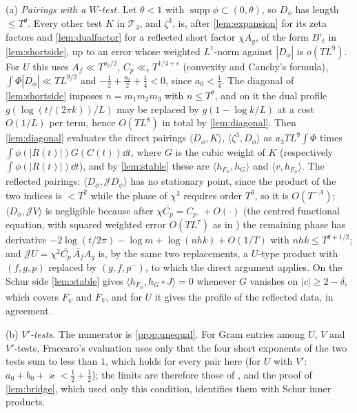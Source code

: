 \documentclass[11pt,colorlinks]{charlie}
\newcommand{\ip}[2]{\langle #1,#2\rangle}
\begin{document}
(a) \emph{Pairings with a $W$-test.} Let $\theta<1$ with $\operatorname{supp}\phi\subset(0,\theta)$, so $D_\phi$ has length $\le T^\theta$. Every other test $K$ in $\mathcal T_3$, and $\zeta^3$, is, after \cref{lem:expansion} for its zeta factors and \cref{lem:dualfactor} for a reflected short factor $\chi\overline{A_g}$, of the form $B'_t$ in \cref{lem:shortside}, up to an error whose weighted $L^1$-norm against $|D_\phi|$ is $o(TL^9)$. For $U$ this uses $A_f\ll T^{a_0/2}$, $C_p\ll_\epsilon T^{1/4+\epsilon}$ (convexity and Cauchy's formula), $\int\Phi|D_\phi|\ll TL^{9/2}$ and $-\frac12+\frac{a_0}2+\frac14<0$, since $a_0<\frac14$. The diagonal of \cref{lem:shortside} imposes $n=m_1m_2m_3$ with $n\le T^\theta$, and on it the dual profile $g(\log(t/(2\pi k))/L)$ may be replaced by $g(1-\log k/L)$ at a cost $O(1/L)$ per term, hence $O(TL^8)$ in total by \cref{lem:diagonal}. Then \cref{lem:diagonal} evaluates the direct pairings $\ip{D_\phi}{K}$, $\ip{\zeta^3}{D_\phi}$ as $a_3TL^9\int\Phi$ times $\int\phi(|R(t)|)G(C(t))\dd t$, where $G$ is the cubic weight of $K$ (respectively $\int\phi(|R(t)|)\dd t$), and by \cref{lem:stable} these are $\ip{h_{F_\phi}}{h_G}$ and $\ip{v}{h_{F_\phi}}$. The reflected pairings: $\ip{D_\phi}{\mathcal JD_\psi}$ has no stationary point, since the product of the two indices is $<T^2$ while the phase of $\chi^3$ requires order $T^3$, so it is $O(T^{-A})$; $\ip{D_\phi}{\mathcal JV}$ is negligible because after $\chi\overline{C_p}=C_{p^-}+O(\cdot)$ (the centred functional equation, with squared weighted error $O(TL^7)$ as in \cite[\S2.3]{Fraccaro}) the remaining phase has derivative $-2\log(t/2\pi)-\log m+\log(nhk)+O(1/T)$ with $nhk\le T^{\theta+1/2}$; and $\mathcal JU=\chi^2\overline{C_p}\,\overline{A_f}A_g$ is, by the same two replacements, a $U$-type product with $(f,g,p)$ replaced by $(g,f,p^-)$, to which the direct argument applies. On the Schur side \cref{lem:stable} gives $\ip{h_{F_\phi}}{h_G\circ J}=0$ whenever $G$ vanishes on $|c|\ge2-\delta$, which covers $F_\psi$ and $F_V$, and for $U$ it gives the profile of the reflected data, in agreement.

(b) \emph{$V'$-tests.} The numerator is \cref{prop:unequal}. For Gram entries among $U$, $V$ and $V'$-tests, Fraccaro's evaluation \cite[\S2.3]{Fraccaro} uses only that the four short exponents of the two tests sum to less than $1$, which holds for every pair here (for $U$ with $V'$: $a_0+b_0+\varkappa<\frac12+\frac12$); the limits are therefore those of , and the proof of \cref{lem:bridge}, which used only this condition, identifies them with Schur inner products.
\end{document}
